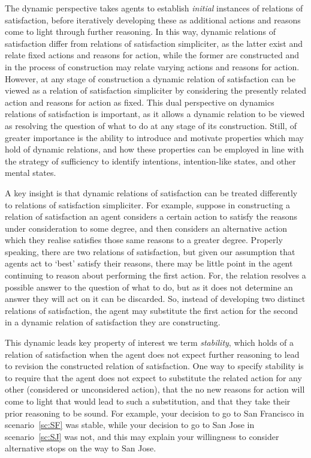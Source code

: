 \documentclass[10pt]{article}
\begin{document}
The dynamic perspective takes agents to establish \emph{initial} instances of relations of satisfaction, before iteratively developing these as additional actions and reasons come to light through further reasoning.
In this way, dynamic relations of satisfaction differ from relations of satisfaction simpliciter, as the latter exist and relate fixed actions and reasons for action, while the former are constructed and in the process of construction may relate varying actions and reasons for action.
However, at any stage of construction a dynamic relation of satisfaction can be viewed as a relation of satisfaction simpliciter by considering the presently related action and reasons for action as fixed.
This dual perspective on dynamics relations of satisfaction is important, as it allows a dynamic relation to be viewed as resolving the question of what to do at any stage of its construction.
Still, of greater importance is the ability to introduce and motivate properties which may hold of dynamic relations, and how these properties can be employed in line with the strategy of sufficiency to identify intentions, intention-like states, and other mental states.

A key insight is that dynamic relations of satisfaction can be treated differently to relations of satisfaction simpliciter.
For example, suppose in constructing a relation of satisfaction an agent considers a certain action to satisfy the reasons under consideration to some degree, and then considers an alternative action which they realise satisfies those same reasons to a greater degree.
Properly speaking, there are two relations of satisfaction, but given our assumption that agents act to `best' satisfy their reasons, there may be little point in the agent continuing to reason about performing the first action.
For, the relation resolves a possible answer to the question of what to do, but as it does not determine an answer they will act on it can be discarded.
So, instead of developing two distinct relations of satisfaction, the agent may substitute the first action for the second in a dynamic relation of satisfaction they are constructing.

This dynamic leads key property of interest we term \emph{stability}, which holds of a relation of satisfaction when the agent does not expect further reasoning to lead to revision the constructed relation of satisfaction.
One way to specify stability is to require that the agent does not expect to substitute the related action for any other (considered or unconsidered action), that the no new reasons for action will come to light that would lead to such a substitution, and that they take their prior reasoning to be sound.
For example, your decision to go to San Francisco in scenario~\ref{sc:SF} was stable, while your decision to go to San Jose in scenario~\ref{sc:SJ} was not, and this may explain your willingness to consider alternative stops on the way to San Jose.
\end{document}

